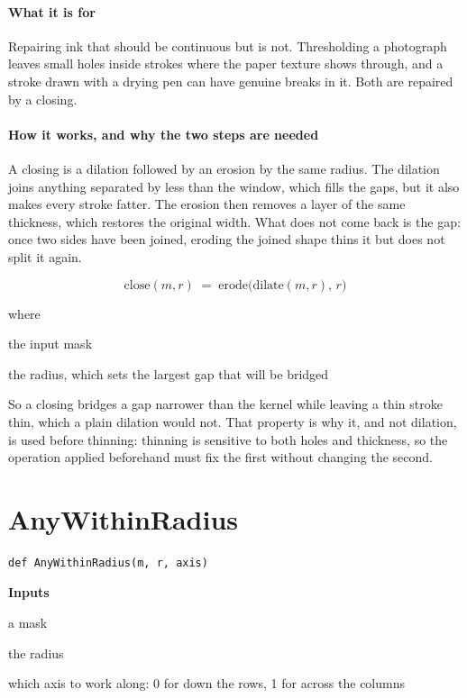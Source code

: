 \paragraph{What it is for}
Repairing ink that should be continuous but is not. Thresholding a photograph leaves small holes inside strokes where the paper texture shows through, and a stroke drawn with a drying pen can have genuine breaks in it. Both are repaired by a closing.


\paragraph{How it works, and why the two steps are needed}
A closing is a dilation followed by an erosion by the same radius. The dilation joins anything separated by less than the window, which fills the gaps, but it also makes every stroke fatter. The erosion then removes a layer of the same thickness, which restores the original width. What does not come back is the gap: once two sides have been joined, eroding the joined shape thins it but does not split it again.


\begin{equation}
\mathrm{close}(m,r) \;=\; \mathrm{erode}\big(\mathrm{dilate}(m,r),\, r\big)
\end{equation}

\noindent where
\begin{description}[leftmargin=2.4em,style=nextline,font=\normalfont\ttfamily]\setlength\itemsep{1pt}
  \item[{$m$}] \normalfont the input mask
  \item[{$r$}] \normalfont the radius, which sets the largest gap that will be bridged
\end{description}
So a closing bridges a gap narrower than the kernel while leaving a thin stroke thin, which a plain dilation would not. That property is why it, and not dilation, is used before thinning: thinning is sensitive to both holes and thickness, so the operation applied beforehand must fix the first without changing the second.


\section{AnyWithinRadius}
\begin{lstlisting}[style=sig]
def AnyWithinRadius(m, r, axis)
\end{lstlisting}

\noindent\textbf{Inputs}
\begin{description}[leftmargin=2.2em,style=nextline,font=\normalfont\ttfamily]\setlength\itemsep{1pt}
  \item[{mask}] \normalfont a mask
  \item[{r}] \normalfont the radius
  \item[{axis}] \normalfont which axis to work along: 0 for down the rows, 1 for across the columns
\end{description}

